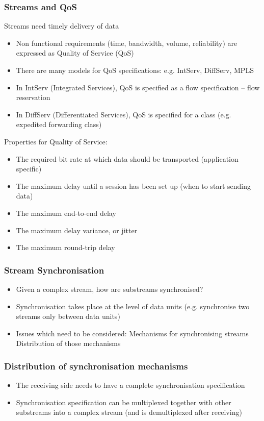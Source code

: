 \subsubsection{Streams and QoS}
Streams need timely delivery of data
\begin{itemize}
	\item Non functional requirements (time, bandwidth, volume, reliability) are expressed as Quality of Service (QoS)
	\item There are many models for QoS specifications: e.g. IntServ, DiffServ, MPLS
	\item In IntServ (Integrated Services), QoS is specified as a flow specification -- flow reservation
	\item In DiffServ (Differentiated Services), QoS is specified for a class (e.g. expedited forwarding class)	
\end{itemize}
Properties for Quality of Service:
\begin{itemize}
	\item The required bit rate at which data should be transported (application specific)
	\item The maximum delay until a session has been set up (when to start sending data)
	\item The maximum end-to-end delay
	\item The maximum delay variance, or jitter
	\item The maximum round-trip delay	
\end{itemize}

\subsubsection{Stream Synchronisation}
\begin{itemize}
	\item Given	a complex stream, how are substreams synchronised?
	\item Synchronisation takes place at the level of data units (e.g. synchronise two streams only between data units)
	\item Issues which need to be considered:
	\subitem Mechanisms for synchronising streams
	\subitem Distribution of those mechanisms
\end{itemize}

\subsubsection{Distribution of synchronisation mechanisms}
\begin{itemize}
	\item The receiving side needs to have a complete synchronisation specification
	\item Synchronisation specification can be multiplexed together with other substreams into a complex stream (and is demultiplexed after receiving)	
\end{itemize}

